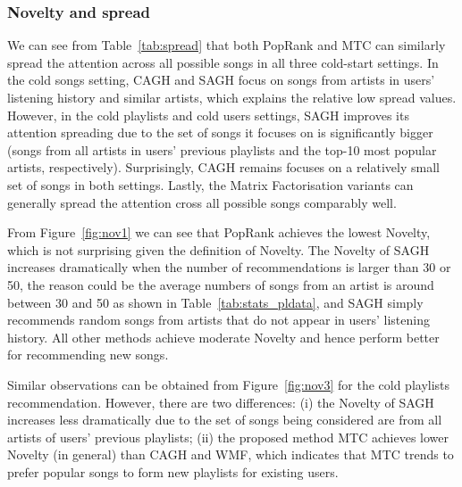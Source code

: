 %        
%        


\subsubsection{Novelty and spread}

We can see from Table~\ref{tab:spread} that both PopRank and MTC can similarly spread the attention across 
all possible songs in all three cold-start settings. 
In the cold songs setting, CAGH and SAGH focus on songs from artists in users' listening history and similar artists, 
which explains the relative low spread values.
However, in the cold playlists and cold users settings, SAGH improves its attention spreading due to the set of songs 
it focuses on is significantly bigger (\ie songs from all artists in users' previous playlists and the top-10 
most popular artists, respectively).
Surprisingly, CAGH remains focuses on a relatively small set of songs in both settings.
Lastly, the Matrix Factorisation variants can generally spread the attention cross 
all possible songs comparably well.

From Figure~\ref{fig:nov1} we can see that PopRank achieves the lowest Novelty,
which is not surprising given the definition of Novelty.
The Novelty of SAGH increases dramatically when the number of recommendations is larger than 30 or 50, 
the reason could be the average numbers of songs from an artist is around between 30 and 50 
as shown in Table~\ref{tab:stats_pldata}, and SAGH simply recommends random
songs from artists that do not appear in users' listening history.
All other methods achieve moderate Novelty and hence perform better for recommending new songs.

Similar observations can be obtained from Figure~\ref{fig:nov3} for the cold playlists recommendation.
However, there are two differences: 
(i) the Novelty of SAGH increases less dramatically due to the set of songs being considered are from
all artists of users' previous playlists; 
(ii) the proposed method MTC achieves lower Novelty (in general) than CAGH and WMF, 
which indicates that MTC trends to prefer popular songs to form new playlists for existing users.

